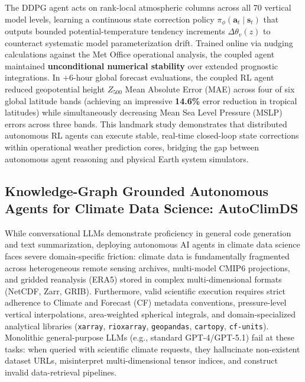 The DDPG agent acts on rank-local atmospheric columns across all 70 vertical model levels, learning a continuous state correction policy $\pi_\phi(\mathbf{a}_t \mid \mathbf{s}_t)$ that outputs bounded potential-temperature tendency increments $\Delta \theta_v(z)$ to counteract systematic model parameterization drift. Trained online via nudging calculations against the Met Office operational analysis, the coupled agent maintained \textbf{unconditional numerical stability} over extended prognostic integrations. In $+6$-hour global forecast evaluations, the coupled RL agent reduced geopotential height $Z_{500}$ Mean Absolute Error (MAE) across four of six global latitude bands (achieving an impressive \textbf{14.6\%} error reduction in tropical latitudes) while simultaneously decreasing Mean Sea Level Pressure (MSLP) errors across three bands. This landmark study demonstrates that distributed autonomous RL agents can execute stable, real-time closed-loop state corrections within operational weather prediction cores, bridging the gap between autonomous agent reasoning and physical Earth system simulators.

\subsection{Knowledge-Graph Grounded Autonomous Agents for Climate Data Science: AutoClimDS}
\label{sec:autoclimds}
While conversational LLMs demonstrate proficiency in general code generation and text summarization, deploying autonomous AI agents in climate data science faces severe domain-specific friction: climate data is fundamentally fragmented across heterogeneous remote sensing archives, multi-model CMIP6 projections, and gridded reanalysis (ERA5) stored in complex multi-dimensional formats (NetCDF, Zarr, GRIB). Furthermore, valid scientific execution requires strict adherence to Climate and Forecast (CF) metadata conventions, pressure-level vertical interpolations, area-weighted spherical integrals, and domain-specialized analytical libraries (\texttt{xarray}, \texttt{rioxarray}, \texttt{geopandas}, \texttt{cartopy}, \texttt{cf-units}). Monolithic general-purpose LLMs (e.g., standard GPT-4/GPT-5.1) fail at these tasks: when queried with scientific climate requests, they hallucinate non-existent dataset URLs, misinterpret multi-dimensional tensor indices, and construct invalid data-retrieval pipelines.

